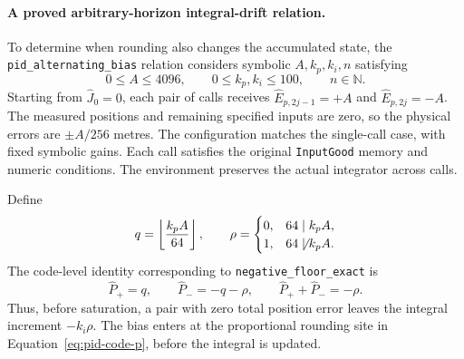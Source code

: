 \documentclass[manuscript, screen, review]{acmart}
\begin{document}
\paragraph{A proved arbitrary-horizon integral-drift relation.}
To determine when rounding also changes the accumulated state, the
\texttt{pid\_\allowbreak alternating\_\allowbreak bias} relation considers symbolic
$A,k_p,k_i,n$ satisfying
\begin{equation}
 0\le A\le4096,\qquad 0\le k_p,k_i\le100,\qquad n\in\mathbb N.
 \label{eq:pid-drift-domain}
\end{equation}
Starting from $\widehat J_0=0$, each pair of calls receives
$\widehat E_{p,2j-1}=+A$ and $\widehat E_{p,2j}=-A$.
The measured positions and remaining specified inputs are zero, so the
physical errors are $\pm A/256$ metres. The configuration matches the
single-call case, with fixed symbolic gains.
Each call satisfies the original \texttt{InputGood} memory and numeric
conditions. The environment preserves the actual integrator across
calls.

Define
\begin{equation}
 q=\left\lfloor\frac{k_pA}{64}\right\rfloor,\qquad
 \rho=
 \begin{cases}
 0,&64\mid k_pA,\\
 1,&64\not\mid k_pA.
 \end{cases}
 \label{eq:pid-residue}
\end{equation}
The code-level identity corresponding to \texttt{negative\_\allowbreak floor\_\allowbreak exact}
is
\begin{equation}
 \widehat P_+=q,\qquad
 \widehat P_-=-q-\rho,\qquad
 \widehat P_++\widehat P_-=-\rho .
 \label{eq:pid-pair-residual}
\end{equation}
Thus, before saturation, a pair with zero total position error leaves
the integral increment $-k_i\rho$. The bias enters at the proportional
rounding site in Equation~\eqref{eq:pid-code-p}, before the integral
is updated.
\end{document}
